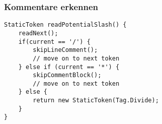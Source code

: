 \subsubsection{Kommentare erkennen}
\begin{lstlisting}
StaticToken readPotentialSlash() {
    readNext();
    if(current == '/') {
        skipLineComment();
        // move on to next token
    } else if (current == '*') {
        skipCommentBlock();
        // move on to next token
    } else {
        return new StaticToken(Tag.Divide);
    }
}
\end{lstlisting}